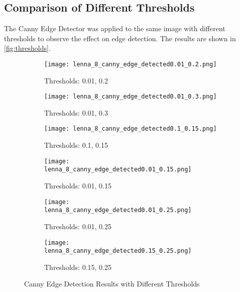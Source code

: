 \clearpage

\subsection{Comparison of Different Thresholds}
The Canny Edge Detector was applied to the same image with different thresholds to observe the effect on edge detection. The results are shown in \autoref{fig:thresholds}.

\begin{figure}[ht]
    \centering
    \begin{subfigure}{0.3\textwidth}
        \centering
        \texttt{[image: lenna\_8\_canny\_edge\_detected0.01\_0.2.png]}
        \caption{Thresholds: 0.01, 0.2}
    \end{subfigure}
    \hfill
    \begin{subfigure}{0.3\textwidth}
        \centering
        \texttt{[image: lenna\_8\_canny\_edge\_detected0.01\_0.3.png]}
        \caption{Thresholds: 0.01, 0.3}
    \end{subfigure}
    \hfill
    \begin{subfigure}{0.3\textwidth}
        \centering
        \texttt{[image: lenna\_8\_canny\_edge\_detected0.1\_0.15.png]}
        \caption{Thresholds: 0.1, 0.15}
    \end{subfigure}
    
    \vspace{0.5cm}
    
    \begin{subfigure}{0.3\textwidth}
        \centering
        \texttt{[image: lenna\_8\_canny\_edge\_detected0.01\_0.15.png]}
        \caption{Thresholds: 0.01, 0.15}
    \end{subfigure}
    \hfill
    \begin{subfigure}{0.3\textwidth}
        \centering
        \texttt{[image: lenna\_8\_canny\_edge\_detected0.01\_0.25.png]}
        \caption{Thresholds: 0.01, 0.25}
    \end{subfigure}
    \hfill
    \begin{subfigure}{0.3\textwidth}
        \centering
        \texttt{[image: lenna\_8\_canny\_edge\_detected0.15\_0.25.png]}
        \caption{Thresholds: 0.15, 0.25}
    \end{subfigure}
    
    \caption{Canny Edge Detection Results with Different Thresholds}
    \label{fig:thresholds}
\end{figure}


